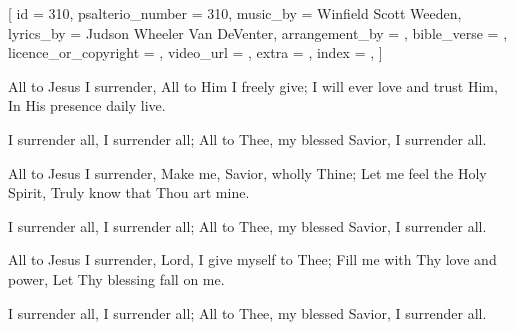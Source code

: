 % 

[
    id                     = {310},
    psalterio_number       = {310},
    music_by               = {Winfield Scott Weeden},
    lyrics_by              = {Judson Wheeler Van DeVenter},
    arrangement_by         = {},
    bible_verse            = {},
    licence_or_copyright   = {},
    video_url              = {},
    extra                  = {},
    index                  = {},
]


\beginverse
All to Jesus I surrender,
All to Him I freely give;
I will ever love and trust Him,
In His presence daily live.
\endverse


\beginchorus

I surrender all,
I surrender all;
All to Thee, my blessed Savior,
I surrender all.
    
\endchorus


\beginverse

All to Jesus I surrender,
Make me, Savior, wholly Thine;
Let me feel the Holy Spirit,
Truly know that Thou art mine.

\endverse


\beginchorus

I surrender all,
I surrender all;
All to Thee, my blessed Savior,
I surrender all.
    
\endchorus


\beginverse
All to Jesus I surrender,
Lord, I give myself to Thee;
Fill me with Thy love and power,
Let Thy blessing fall on me.
\endverse



\beginchorus

I surrender all,
I surrender all;
All to Thee, my blessed Savior,
I surrender all.
    
\endchorus
\endsong
